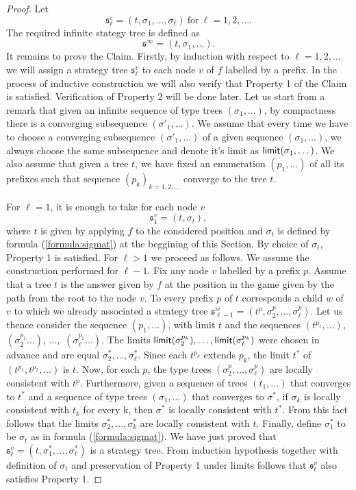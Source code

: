 \begin{proof}
Let \[ \mathfrak{s}^\varepsilon_\ell = (t, \sigma_1, \dots, \sigma_\ell)\ \mbox{for}\ \ell=1,2,\dots.\] The required   
infinite stategy tree is defined as 
\[ \mathfrak{s}^\infty = (t, \sigma_1, \dots ). \]
It remains to prove the Claim.
Firstly, by induction with respect to $\ell=1,2,\dots$ we will assign a strategy tree $\mathfrak{s}^v_\ell$ to each node $v$ of $f$ labelled by a prefix. %
In the process of inductive construction we will also verify that Property 1 of the Claim is satisfied. Verification of Property 2 will be done later. Let us start from a remark that given an infinite sequence of type trees $(\sigma_1, \dots)$, by compactness there is a converging subsequence $(\sigma'_1, \dots)$. We assume that every time we have to choose  
a converging subsequence $(\sigma'_1, \dots)$ of a given sequence $(\sigma_1, \dots)$, we always choose the same subsequence and denote it's limit as 
$\mathsf{limit}(\sigma_1, \dots)$. We also assume that given a tree $t$, we have fixed an enumeration $(p_1, \dots)$ of all its prefixes such 
that sequence $(p_k)_{k=1,2,\dots}$ converge to the tree $t$.

For $\ell=1$, 
it is enough to take for each node $v$  \[ \mathfrak{s}^v_1=(t, \sigma_t),\] where $t$ is given by applying $f$ to the considered position and $\sigma_t$ is defined by formula (\ref{formula:sigmat}) at the beggining of this Section. By choice of $\sigma_t$, Property 1 is satisfied. For $\ell>1$ we proceed as follows. We assume the construction performed for $\ell-1$. Fix any node $v$ labelled by a prefix $p$. Assume that a tree $t$ is the answer given by $f$  at the position in the game given by the path from the root to the node $v$. To every prefix $p$ of $t$ corresponds a child $w$ of $v$ to which we already associated a strategy tree $\mathfrak{s}^w_{\ell-1}=(t^p, \sigma^p_{2}, \dots, \sigma^p_{\ell})$. 
Let us thence consider the sequence $(p_1, \dots)$, with limit $t$ and the sequences
$(t^{p_1}, \dots)$, $(\sigma^{p_1}_2\dots)$, $\dots,$  $(\sigma^{p_1}_{\ell}\dots)$.  The limits $\mathsf{limit}(\sigma^{p_k}_2),\dots,
\mathsf{limit}(\sigma^{p_k}_{\ell})$ were chosen in advance and are equal $\sigma^*_2, \dots, \sigma^*_\ell$. Since each $t^{p_k}$ extends $p_k$, the limit $t^*$ of  $(t^{p_1},t^{p_2},\dots)$ is $t$.
Now, for each $p$, the type trees $(\sigma^p_{2}, \dots, \sigma^p_{\ell})$
are locally consistent with $t^p$. Furthermore, given a sequence of trees $(t_1, \dots)$  that converges to $t^*$ and a sequence of type trees $(\sigma_1, \dots)$  that converges to $\sigma^*$, if $\sigma_k$ is locally consistent with $t_k$ for every k, then $\sigma^*$ is locally consistent with $t^*$.
From this fact follows that the limits $\sigma^*_2, \dots, \sigma^*_k$ are locally consistent with $t$. Finally, define $\sigma^*_1$ to be $\sigma_t$ as in formula (\ref{formula:sigmat}). We have just proved that
$\mathfrak{s}^v_\ell = (t, \sigma^*_1, \dots, \sigma^*_\ell)$
is a strategy tree. From induction hypothesis together with definition of $\sigma_t$ and preservation of Property 1 under limits follows that $\mathfrak{s}^v_\ell$ also 
satisfies Property 1. 


\end{proof}
